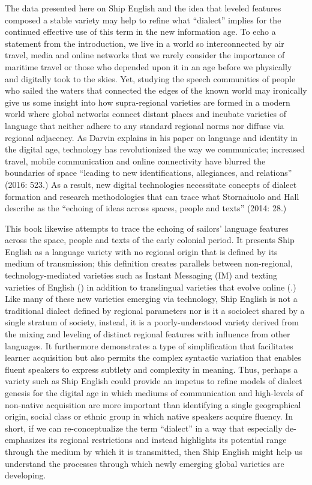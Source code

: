 The data presented here on Ship English and the idea that leveled features composed a stable variety may help to refine what “dialect” implies for the continued effective use of this term in the new information age. To echo a statement from the introduction, we live in a world so interconnected by air travel, media and online networks that we rarely consider the importance of maritime travel or those who depended upon it in an age before we physically and digitally took to the skies. Yet, studying the speech communities of people who sailed the waters that connected the edges of the known world may ironically give us some insight into how supra-regional varieties are formed in a modern world where global networks connect distant places and incubate varieties of language that neither adhere to any standard regional norms nor diffuse via regional adjacency. As Darvin explains in his paper on language and identity in the digital age, technology has revolutionized the way we communicate; increased travel, mobile communication and online connectivity have blurred the boundaries of space “leading to new identifications, allegiances, and relations” (2016: 523.) As a result, new digital technologies necessitate concepts of dialect formation and research methodologies that can trace what Stornaiuolo and Hall describe as the “echoing of ideas across spaces, people and texts” (2014: 28.) 

This book likewise attempts to trace the echoing of sailors’ language features across the space, people and texts of the early colonial period. It presents Ship English as a language variety with no regional origin that is defined by its medium of transmission; this definition creates parallels between non-regional, technology-mediated varieties such as Instant Messaging (IM) and texting varieties of English (\citealt{WarschauerMatuchniak2010}) in addition to translingual varieties that evolve online (\citealt{Canagarajah2013}.)  Like many of these new varieties emerging via technology, Ship English is not a traditional dialect defined by regional parameters nor is it a sociolect shared by a single stratum of society, instead, it is a poorly-understood variety derived from the mixing and leveling of distinct regional features with influence from other languages. It furthermore demonstrates a type of simplification that facilitates learner acquisition but also permits the complex syntactic variation that enables fluent speakers to express subtlety and complexity in meaning. Thus, perhaps a variety such as Ship English could provide an impetus to refine models of dialect genesis for the digital age in which mediums of communication and high-levels of non-native acquisition are more important than identifying a single geographical origin, social class or ethnic group in which native speakers acquire fluency. In short, if we can re-conceptualize the term “dialect” in a way that especially de-emphasizes its regional restrictions and instead highlights its potential range through the medium by which it is transmitted, then Ship English might help us understand the processes through which newly emerging global varieties are developing. 

